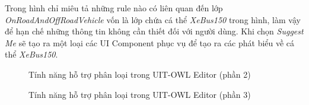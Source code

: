 Trong hình chỉ miêu tả những rule nào có liên quan đến lớp \textit{OnRoadAndOffRoadVehicle} vốn là lớp chứa cá thể \textit{XeBus150} trong hình, làm vậy để hạn chế những thông tin không cần thiết đối với người dùng. Khi chọn \textit{Suggest Me} sẽ tạo ra một loại các UI Component phục vụ để tạo ra các phát biểu về cá thể \textit{XeBus150}.
\begin{figure}[h!]
	\centering
	\caption{Tính năng hỗ trợ phân loại trong UIT-OWL Editor (phần 2)\label{overflow}}
\end{figure}
\begin{figure}[h!]
	\centering
	\caption{Tính năng hỗ trợ phân loại trong UIT-OWL Editor (phần 3)\label{overflow}}
\end{figure}
